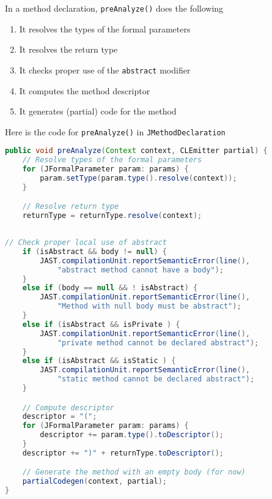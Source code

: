 \documentclass[8pt,a4paper,compress]{beamer}
\begin{document}
\begin{frame}[fragile]
\pause

In a method declaration, \lstinline{preAnalyze()} does the following
\begin{enumerate}
\pause
\item It resolves the types of the formal parameters
\pause
\item It resolves the return type
\pause
\item It checks proper use of the \lstinline{abstract} modifier
\pause
\item It computes the method descriptor
\pause
\item It generates (partial) code for the method
\end{enumerate}

\pause
\bigskip

Here is the code for \lstinline{preAnalyze()} in \lstinline{JMethodDeclaration}
\begin{lstlisting}[language=Java,style=focusin]
public void preAnalyze(Context context, CLEmitter partial) {
    // Resolve types of the formal parameters
    for (JFormalParameter param: params) {
        param.setType(param.type().resolve(context));
    }

    // Resolve return type
    returnType = returnType.resolve(context);
    
\end{lstlisting}
\end{frame}

\begin{frame}[fragile]
\pause

\begin{lstlisting}[language=Java,style=focusin]
    // Check proper local use of abstract
    if (isAbstract && body != null) {
        JAST.compilationUnit.reportSemanticError(line(),
            "abstract method cannot have a body");
    }
    else if (body == null && ! isAbstract) {
        JAST.compilationUnit.reportSemanticError(line(),
            "Method with null body must be abstract");
    }
    else if (isAbstract && isPrivate ) {
        JAST.compilationUnit.reportSemanticError(line(),
            "private method cannot be declared abstract");
    }
    else if (isAbstract && isStatic ) {
        JAST.compilationUnit.reportSemanticError(line(),
            "static method cannot be declared abstract");
    }

    // Compute descriptor
    descriptor = "(";
    for (JFormalParameter param: params) {
        descriptor += param.type().toDescriptor();
    }
    descriptor += ")" + returnType.toDescriptor();

    // Generate the method with an empty body (for now)
    partialCodegen(context, partial);
}
\end{lstlisting}
\end{frame}
\end{document}
